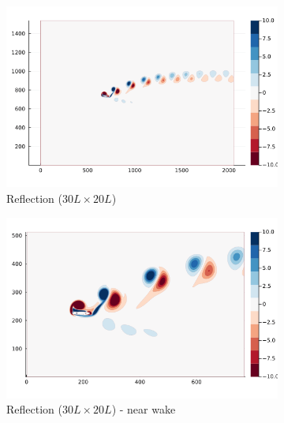\documentclass[final,1p,times]{elsarticle}
\begin{document}
\begin{figure}
    \centering
    \begin{subfigure}{.48\textwidth}
        \centering
        \includegraphics[trim={2.8cm 2cm 4cm 2cm},clip,width=\textwidth]{tex//fig/Deflected_wake_snap.png}
        \caption{Reflection ($30L\times20L$)}
    \end{subfigure}%
    \hspace{0.1cm}
    \begin{subfigure}{.48\textwidth}
        \centering
        \includegraphics[trim={2.8cm 2cm 4cm 2cm},clip,width=\textwidth]{tex/fig/Deflected_wake_snap_small.png}
        \caption{Reflection ($30L\times20L$) - near wake}
    \end{subfigure}
    \begin{subfigure}{.48\textwidth}
        \centering

\end{subfigure}
\end{figure}
\end{document}
